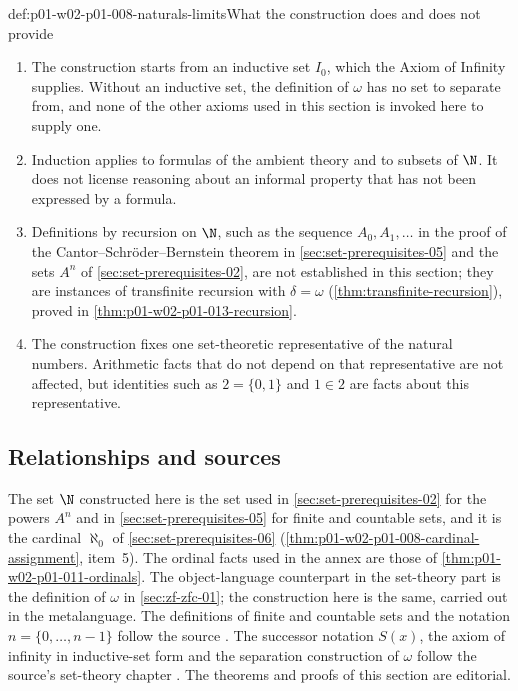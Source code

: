 \begin{hbwarning}{def:p01-w02-p01-008-naturals-limits}{What the construction does and does not provide}
\begin{enumerate}
  \item The construction starts from an inductive set \(I_0\), which the
        Axiom of Infinity supplies. Without an inductive set, the definition
        of \(\omega\) has no set to separate from, and none of the other
        axioms used in this section is invoked here to supply one.
  \item Induction applies to formulas of the ambient theory and to subsets
        of \(\N\). It does not license reasoning about an informal property
        that has not been expressed by a formula.
  \item Definitions by recursion on \(\N\), such as the sequence
        \(A_0,A_1,\ldots\) in the proof of the Cantor--Schr\"oder--Bernstein
        theorem in \cref{sec:set-prerequisites-05} and the sets \(A^n\) of
        \cref{sec:set-prerequisites-02}, are not established in this
        section; they are instances of transfinite recursion with
        \(\delta=\omega\) (\cref{thm:transfinite-recursion}), proved in
        \cref{thm:p01-w02-p01-013-recursion}.
  \item The construction fixes one set-theoretic representative of the
        natural numbers. Arithmetic facts that do not depend on that
        representative are not affected, but identities such as
        \(2=\{0,1\}\) and \(1\in2\) are facts about this representative.
\end{enumerate}
\end{hbwarning}

\subsection{Relationships and sources}
\label{sec:p01-w02-p01-008-naturals-sources}

The set \(\N\) constructed here is the set used in
\cref{sec:set-prerequisites-02} for the powers \(A^n\) and in
\cref{sec:set-prerequisites-05} for finite and countable sets, and it is the
cardinal \(\aleph_0\) of \cref{sec:set-prerequisites-06}
(\cref{thm:p01-w02-p01-008-cardinal-assignment}, item~5). The ordinal facts
used in the annex are those of \cref{thm:p01-w02-p01-011-ordinals}. The
object-language counterpart in the set-theory part is the definition of
\(\omega\) in \cref{sec:zf-zfc-01}; the construction here is the same,
carried out in the metalanguage. The definitions of finite and countable
sets and the notation \(n=\{0,\ldots,n-1\}\) follow the source
\cite[ch.~``Sets, Relations, Functions, and Cardinality'', sec.~``Finite,
countable, and uncountable sets'', definitions ``Finite set'', ``Countable
set'' and ``Cardinal comparison'']{FrozenFormalLogicOrdersChoice}. The
successor notation \(S(x)\), the axiom of infinity in inductive-set form and
the separation construction of \(\omega\) follow the source's set-theory
chapter \cite[ch.~``The Axioms of ZF and ZFC'', definitions ``Infinity'' and
``The set \(\omega\)'']{FrozenFormalLogicOrdersChoice}. The theorems and
proofs of this section are editorial.

